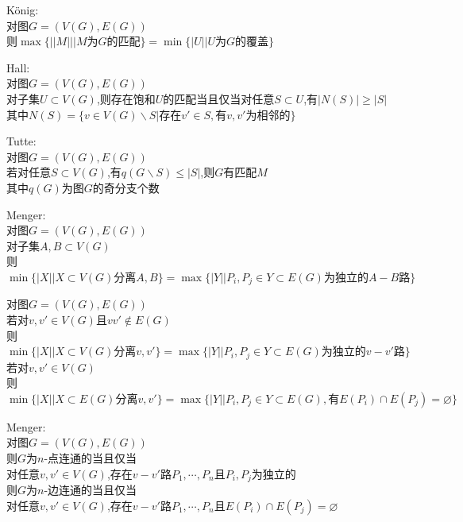 \begin{dingli}
König:\\
对图$G=(V(G),E(G))$\\
则$\max\{||M||\Big|M\text{为}G\text{的匹配}\}=\min\{|U|\Big|U\text{为}G\text{的覆盖}\}$
\end{dingli}

\begin{dingli}
Hall:\\
对图$G=(V(G),E(G))$\\
对子集$U\subset V(G)$,则存在饱和$U$的匹配当且仅当对任意$S\subset U$,有$|N(S)|\geq|S|$\\
其中$N(S)=\{v\in V(G)\backslash S|\text{存在}v'\in S,\text{有}v,v'\text{为相邻的}\}$
\end{dingli}

\begin{dingli}
Tutte:\\
对图$G=(V(G),E(G))$\\
若对任意$S\subset V(G)$,有$q(G\backslash S)\leq|S|$,则$G$有匹配$M$\\
其中$q(G)$为图$G$的奇分支个数
\end{dingli}

\begin{dingli}
Menger:\\
对图$G=(V(G),E(G))$\\
对子集$A,B\subset V(G)$\\
则$\min\{|X|\Big|X\subset V(G)\text{分离}A,B\}=\max\{|Y|\Big|P_i,P_j\in Y\subset E(G)\text{为独立的}A-B\text{路}\}$
\end{dingli}

\begin{dingli}
对图$G=(V(G),E(G))$\\
若对$v,v'\in V(G)$且$vv'\notin E(G)$\\
则$\min\{|X|\Big|X\subset V(G)\text{分离}v,v'\}=\max\{|Y|\Big|P_i,P_j\in Y\subset E(G)\text{为独立的}v-v'\text{路}\}$\\
若对$v,v'\in V(G)$\\
则$\min\{|X|\Big|X\subset E(G)\text{分离}v,v'\}=\max\{|Y|\Big|P_i,P_j\in Y\subset E(G),\text{有}E(P_i)\cap E(P_j)=\varnothing\}$
\end{dingli}

\begin{dingli}
Menger:\\
对图$G=(V(G),E(G))$\\
则$G$为$n$-点连通的当且仅当\\
对任意$v,v'\in V(G)$,存在$v-v'$路$P_1,\cdots,P_n$且$P_i,P_j$为独立的\\
则$G$为$n$-边连通的当且仅当\\
对任意$v,v'\in V(G)$,存在$v-v'$路$P_1,\cdots,P_n$且$E(P_i)\cap E(P_j)=\varnothing$
\end{dingli}

